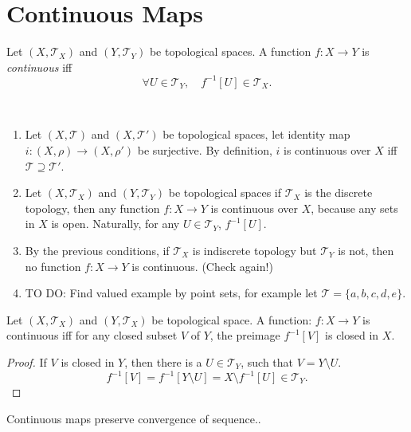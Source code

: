 \section{Continuous Maps}


\begin{definition}
	Let $(X, \mathcal T_X)$ and $(Y, \mathcal T_Y)$ be topological spaces. A function $f: X \to Y$ is \textit{continuous} iff
	$$
	\forall U \in \mathcal T_Y, \quad f^{-1}[U] \in \mathcal T_X.
	$$
\end{definition}


\begin{note} \
	\begin{enumerate}
		\item Let $(X, \mathcal T)$ and $(X, \mathcal T')$ be topological spaces, let identity map $i:(X, \rho) \to (X, \rho')$ be surjective. By definition, $i$ is continuous over $X$ iff $\mathcal T \supseteq \mathcal T'$.
		\item Let $(X, \mathcal T_X)$ and $(Y, \mathcal T_Y)$ be topological spaces if $\mathcal T_X$ is the discrete topology, then any function $f: X \to Y$ is continuous over $X$, because any sets in $X$ is open. Naturally, for any $U \in \mathcal T_Y$, $f^{-1}[U]$.
		\item By the previous conditions, if $\mathcal T_X$ is indiscrete topology but $\mathcal T_Y$ is not, then no function $f: X \to Y$ is continuous. (Check again!)
		\item TO DO: Find valued example by point sets, for example let $\mathcal T = \{a, b, c, d, e\}$.
	\end{enumerate}
\end{note}


\begin{lemma}
	Let $(X, \mathcal T_X)$ and $(Y, \mathcal T_X)$ be topological space. A function: $f:X\to Y$ is continuous iff for any closed subset $V$ of $Y$, the preimage $f^{-1}[V]$ is closed in $X$.
\end{lemma}


\begin{proof}
	If $V$ is closed in $Y$, then there is a $U \in \mathcal T_Y$, such that $V = Y \setminus U$.
	$$
	f^{-1}[V] = f^{-1}[Y \setminus U] = X \setminus f^{-1}[U] \in \mathcal T_Y.
	$$
\end{proof}


\begin{lemma}
	Continuous maps preserve convergence of sequence..
\end{lemma}

































%
